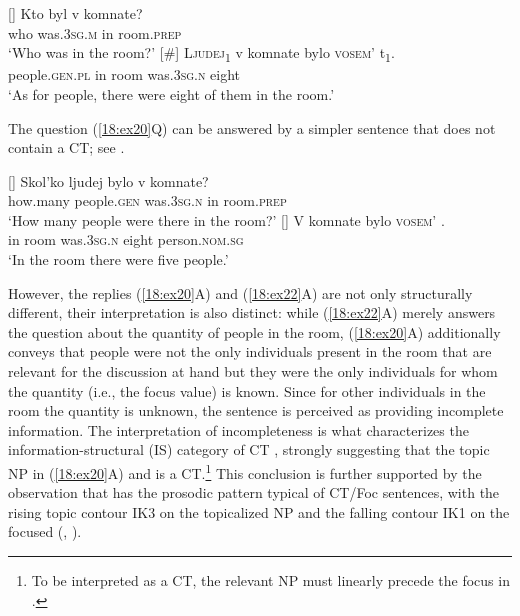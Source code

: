 \documentclass[output=paper,modfonts,newtxmath,hidelinks]{langscibook}
\begin{document}
\begin{exe}
\ex \label{18:ex21}
\begin{xlist}
[]{
	\gll 
    	 Kto byl v komnate?\\
         who was.\textsc{3sg.m} in room.\textsc{prep}\\
	\glt `Who was in the room?'
    }
[\#]{
	\gll \textsc{Ljudej\textsubscript{1}}  v   komnate  bylo     \textsc{vosem’}   t\textsubscript{1}.\\
		 people.\textsc{gen.pl} in   room    was.\textsc{3sg.n}  eight  \\
    	\glt `As for people, there were eight of them in the room.'
        }
\end{xlist}
\end{exe}

\noindent The question (\ref{18:ex20}Q) can be answered by a simpler sentence that does not contain a CT; see .

\begin{exe}
\ex \label{18:ex22}
\begin{xlist}
[]{
	\gll 
    	 Skol’ko ljudej bylo v komnate?\\
         how.many people.\textsc{gen} was.\textsc{3sg.n} in room.\textsc{prep}\\
	\glt `How many people were there in the room?'
    }
[]{
	\gll V  komnate  bylo    \textsc{vosem’}    .\\
		 in  room    was.\textsc{3sg.n}  eight     person.\textsc{nom.sg}\\
    \glt `In the room there were five people.'     
    }
\end{xlist}
\end{exe}


\largerpage[2]
\noindent However, the replies (\ref{18:ex20}A) and (\ref{18:ex22}A) are not only structurally different, their interpretation is also distinct: while (\ref{18:ex22}A) merely answers the question about the quantity of people in the room, (\ref{18:ex20}A) additionally conveys that people were not the only individuals present in the room that are relevant for the discussion at hand but they were the only individuals for whom the quantity (i.e., the focus value) is known. Since for other individuals in the room the quantity is unknown, the sentence is perceived as providing incomplete information. The interpretation of incompleteness is what characterizes the information-structural (IS) category of CT \citep{Büring2003}, strongly suggesting that the topic NP in (\ref{18:ex20}A) and  is a CT.\footnote{\label{18:fn18}To be interpreted as a CT, the relevant NP must linearly precede the focus in  \citep{Titov2013}.} This conclusion is further supported by the observation that  has the prosodic pattern typical of CT/Foc sentences, with the rising topic contour IK3 on the topicalized NP and the falling contour IK1 on the focused  (\citealt{Bryzgunova1971, Bryzgunova1981}, \citealt{Titov2013}).
\end{document}
